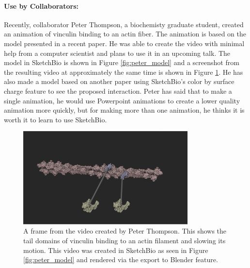 \documentclass{article} %
\begin{document}
\paragraph{Use by Collaborators:}
Recently, collaborator Peter Thompson, a biochemisty graduate student, created an animation of vinculin binding to an actin fiber.  The animation is based on the model presented in a recent paper.  He was able to create the video with minimal help from a computer scientist and plans to use it in an upcoming talk.  The model in SketchBio is shown in Figure \ref{fig:peter_model} and a screenshot from the resulting video at approximately the same time is shown in Figure \ref{fig:peter_video}.  He has also made a model based on another paper using SketchBio's color by surface charge feature to see the proposed interaction.  Peter has said that to make a single animation, he would use Powerpoint animations to create a lower quality animation more quickly, but for making more than one animation, he thinks it is worth it to learn to use SketchBio.


\begin{figure}[h!]
\centering
\includegraphics[width=0.8\textwidth]{peter_video.png}
\caption{A frame from the video created by Peter Thompson.  This shows the tail domains of vinculin binding to an actin filament and slowing its motion.  This video was created in SketchBio as seen in Figure \ref{fig:peter_model} and rendered via the export to Blender feature.}
\label{fig:peter_video}
\end{figure}

\end{document}
